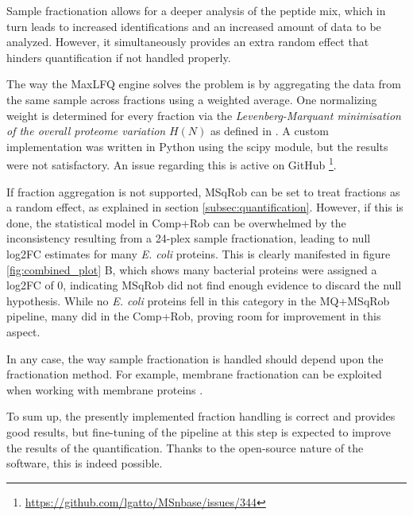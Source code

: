 Sample fractionation allows for a deeper analysis of the peptide mix, which in turn leads to increased identifications and an increased amount of data to be analyzed. However, it simultaneously provides an extra random effect that hinders quantification if not handled properly.

The way the MaxLFQ engine solves the problem is by aggregating the data from the same sample across fractions using a weighted average. One normalizing weight is determined for every fraction via the \textit{Levenberg-Marquant minimisation of the overall proteome variation} $H(N)$ as defined in \cite{Cox2014}. A custom implementation was written in Python using the scipy module, but the results were not satisfactory. An issue regarding this is active on GitHub \footnote{\href{https://github.com/lgatto/MSnbase/issues/344}{https://github.com/lgatto/MSnbase/issues/344}}.

If fraction aggregation is not supported, MSqRob can be set to treat fractions as a random effect, as explained in section \ref{subsec:quantification}. However, if this is done, the statistical model in Comp+Rob can be overwhelmed by the inconsistency resulting from a 24-plex sample fractionation, leading to null \ac{log2FC} estimates for many \textit{E. coli} proteins. This is clearly manifested in figure \ref{fig:combined_plot} B, which shows many bacterial proteins were assigned  a \ac{log2FC} of 0, indicating MSqRob did not find enough evidence to discard the null hypothesis. While no \textit{E. coli} proteins fell in this category in the MQ+MSqRob pipeline, many did in the Comp+Rob, proving room for improvement in this aspect.

In any case, the way sample fractionation is handled should depend upon the fractionation method. For example, membrane fractionation can be exploited when working with membrane proteins \cite{Marmagne2006}.

To sum up, the presently implemented fraction handling is correct and provides good results, but fine-tuning of the pipeline at this step is expected to improve the results of the quantification. Thanks to the open-source nature of the software, this is indeed possible.


%
%
%
%
%


